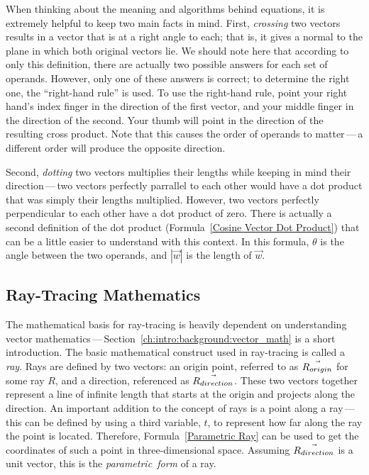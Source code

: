 When thinking about the meaning and algorithms behind equations, it is extremely helpful to keep two main facts in mind.
First, {\it crossing\/} two vectors results in a vector that is at a right angle to each; that is, it gives a normal to the plane in which both original vectors lie.
We should note here that according to only this definition, there are actually two possible answers for each set of operands.
However, only one of these answers is correct; to determine the right one, the ``right-hand rule'' is used.
To use the right-hand rule, point your right hand's index finger in the direction of the first vector, and your middle finger in the direction of the second.
Your thumb will point in the direction of the resulting cross product.
Note that this causes the order of operands to matter\,---\,a different order will produce the opposite direction.


Second, {\it dotting\/} two vectors multiplies their lengths while keeping in mind their direction\,---\,two vectors perfectly parrallel to each other would have a dot product that was simply their lengths multiplied.
However, two vectors perfectly perpendicular to each other have a dot product of zero.
There is actually a second definition of the dot product (Formula~\ref{Cosine Vector Dot Product}) that can be a little easier to understand with this context.
In this formula, $\theta$ is the angle between the two operands, and $|\vec{w}|$ is the length of $\vec{w}$.

\subsection{Ray-Tracing Mathematics}
\label{ch:intro:background:raytracing_math}

The mathematical basis for ray-tracing is heavily dependent on understanding vector mathematics\,---\,Section~\ref{ch:intro:background:vector_math} is a short introduction.
The basic mathematical construct used in ray-tracing is called a {\it ray}.
Rays are defined by two vectors: an origin point, referred to as $\vec{R_{origin}}$ for some ray $R$, and a direction, referenced as $\vec{R_{direction}}$.
These two vectors together represent a line of infinite length that starts at the origin and projects along the direction.
An important addition to the concept of rays is a point along a ray\,---\,this can be defined by using a third variable, $t$, to represent how far along the ray the point is located.
Therefore, Formula~\ref{Parametric Ray} can be used to get the coordinates of such a point in three-dimensional space.
Assuming $\vec{R_{direction}}$ is a unit vector, this is the {\it parametric~form\/} of a ray.

